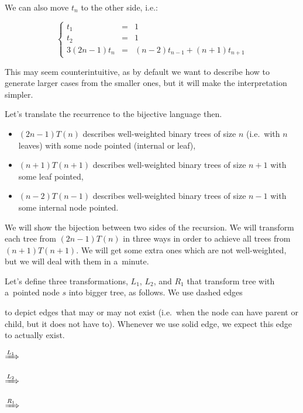 \documentclass[final]{article}
\theoremstyle{definition}
\theoremstyle{definition}
\theoremstyle{remark}
\newcommand{\includeinlinescaledsvg}[3]{\begin{minipage}{#1\textwidth}\begin{center}\end{center}\end{minipage}}
\begin{document}
We can also move \(t_n\) to the other side, i.e.:

\[\left\{\begin{array}{rcl}
            t_1 &=& 1\\
            t_2 &=& 1\\
            3 (2 n - 1) t_n &=& (n - 2) t_{n - 1} + (n + 1) t_{n + 1}
\end{array}\right.\]

This may seem counterintuitive, as by default we want to describe how to generate larger cases from the smaller ones, but it will make the interpretation simpler.

Let's translate the recurrence to the bijective language then.
\begin{itemize}
    \item \((2 n - 1) T(n)\) describes well-weighted binary trees of size \(n\) (i.e.~with \(n\) leaves) with some node pointed (internal or leaf),
    \item \((n + 1) T(n + 1)\) describes well-weighted binary trees of size \(n + 1\) with some leaf pointed,
    \item \((n - 2) T(n - 1)\) describes well-weighted binary trees of size \(n - 1\) with some internal node pointed.
\end{itemize}

We will show the bijection between two sides of the recursion. We will transform each tree from \((2 n - 1) T(n)\) in three ways in order to achieve all trees from \((n + 1) T(n + 1)\). We will get some extra ones which are not well-weighted, but we will deal with them in a~minute.

Let's define three transformations, \(L_1\), \(L_2\), and \(R_1\) that transform tree with a~pointed node \(s\) into bigger tree, as follows. We use dashed edges 
\begin{minipage}{1.5em}

\end{minipage}
to depict edges that may or may not exist (i.e.~when the node can have parent or child, but it does not have to). Whenever we use solid edge, we expect this edge to actually exist.

\begin{center}
    \includeinlinescaledsvg{.16}{.5}{schroder__lr_base}%
    \(\xRightarrow{L_1}\)%
    \includeinlinescaledsvg{.16}{.5}{schroder__l1}%
    \hspace{.1\textwidth}%
    \includeinlinescaledsvg{.16}{.5}{schroder__lr_base}%
    \(\xRightarrow{L_2}\)%
    \includeinlinescaledsvg{.16}{.5}{schroder__l2}%

    \includeinlinescaledsvg{.16}{.5}{schroder__lr_base}%
    \(\xRightarrow{R_1}\)%
    \includeinlinescaledsvg{.16}{.5}{schroder__r1}%
\end{center}
\end{document}

